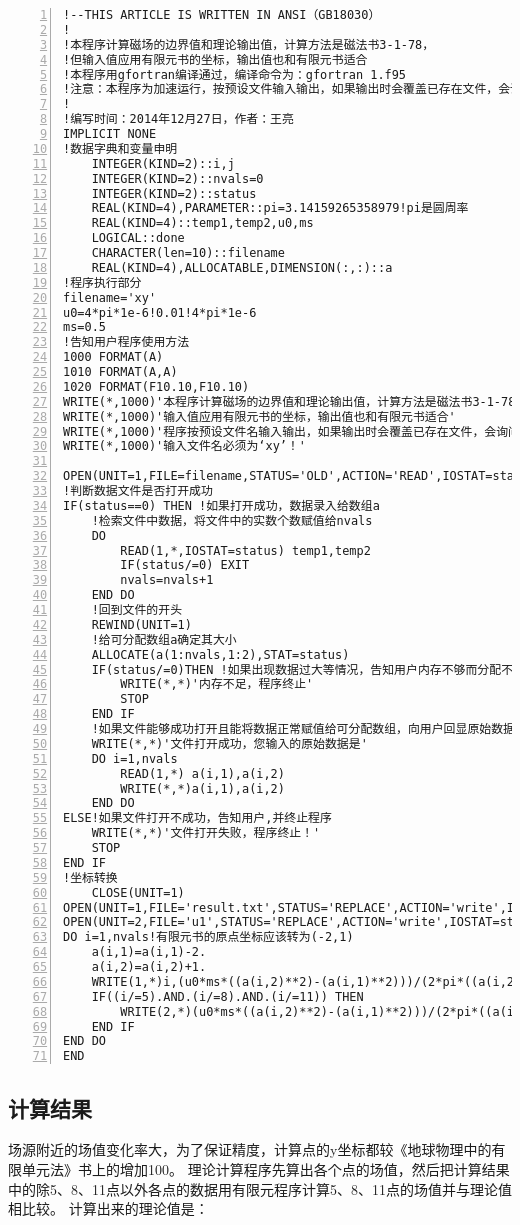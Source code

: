 \documentclass[hyperref,UTF-8]{ctexart}
\begin{document}
\begin{Verbatim}[numbers=left,commandchars=\\\{\},fontsize=\small,frame=single]
!--THIS ARTICLE IS WRITTEN IN ANSI（GB18030）
!
!本程序计算磁场的边界值和理论输出值，计算方法是磁法书3-1-78，
!但输入值应用有限元书的坐标，输出值也和有限元书适合
!本程序用gfortran编译通过，编译命令为：gfortran 1.f95 
!注意：本程序为加速运行，按预设文件输入输出，如果输出时会覆盖已存在文件，会询问用户！
!
!编写时间：2014年12月27日，作者：王亮
IMPLICIT NONE
!数据字典和变量申明
	INTEGER(KIND=2)::i,j
	INTEGER(KIND=2)::nvals=0
	INTEGER(KIND=2)::status
	REAL(KIND=4),PARAMETER::pi=3.14159265358979!pi是圆周率
	REAL(KIND=4)::temp1,temp2,u0,ms
	LOGICAL::done
	CHARACTER(len=10)::filename
	REAL(KIND=4),ALLOCATABLE,DIMENSION(:,:)::a
!程序执行部分
filename='xy'
u0=4*pi*1e-6!0.01!4*pi*1e-6
ms=0.5
!告知用户程序使用方法
1000 FORMAT(A)
1010 FORMAT(A,A)
1020 FORMAT(F10.10,F10.10)
WRITE(*,1000)'本程序计算磁场的边界值和理论输出值，计算方法是磁法书3-1-78'
WRITE(*,1000)'输入值应用有限元书的坐标，输出值也和有限元书适合'
WRITE(*,1000)'程序按预设文件名输入输出，如果输出时会覆盖已存在文件，会询问用户！'
WRITE(*,1000)'输入文件名必须为‘xy’！'

OPEN(UNIT=1,FILE=filename,STATUS='OLD',ACTION='READ',IOSTAT=status)
!判断数据文件是否打开成功
IF(status==0) THEN !如果打开成功，数据录入给数组a
	!检索文件中数据，将文件中的实数个数赋值给nvals
	DO
		READ(1,*,IOSTAT=status) temp1,temp2
		IF(status/=0) EXIT
		nvals=nvals+1
	END DO
	!回到文件的开头
	REWIND(UNIT=1)
	!给可分配数组a确定其大小
	ALLOCATE(a(1:nvals,1:2),STAT=status)
	IF(status/=0)THEN !如果出现数据过大等情况，告知用户内存不够而分配不成功，程序终止
		WRITE(*,*)'内存不足，程序终止'
		STOP
	END IF
	!如果文件能够成功打开且能将数据正常赋值给可分配数组，向用户回显原始数据
	WRITE(*,*)'文件打开成功，您输入的原始数据是'
	DO i=1,nvals
		READ(1,*) a(i,1),a(i,2)
		WRITE(*,*)a(i,1),a(i,2)
	END DO
ELSE!如果文件打开不成功，告知用户,并终止程序
	WRITE(*,*)'文件打开失败，程序终止！'
	STOP
END IF
!坐标转换
	CLOSE(UNIT=1)
OPEN(UNIT=1,FILE='result.txt',STATUS='REPLACE',ACTION='write',IOSTAT=status)
OPEN(UNIT=2,FILE='u1',STATUS='REPLACE',ACTION='write',IOSTAT=status)
DO i=1,nvals!有限元书的原点坐标应该转为(-2,1)
	a(i,1)=a(i,1)-2.
	a(i,2)=a(i,2)+1.
	WRITE(1,*)i,(u0*ms*((a(i,2)**2)-(a(i,1)**2)))/(2*pi*((a(i,2)**2+a(i,1)**2)**2)) 
	IF((i/=5).AND.(i/=8).AND.(i/=11)) THEN
		WRITE(2,*)(u0*ms*((a(i,2)**2)-(a(i,1)**2)))/(2*pi*((a(i,2)**2+a(i,1)**2)**2)) 
	END IF
END DO
END
\end{Verbatim}
\subsection{计算结果}
场源附近的场值变化率大，为了保证精度，计算点的y坐标都较《地球物理中的有限单元法》书上的增加100。
理论计算程序先算出各个点的场值，然后把计算结果中的除5、8、11点以外各点的数据用有限元程序计算5、8、11点的场值并与理论值相比较。
计算出来的理论值是：
\end{document}
